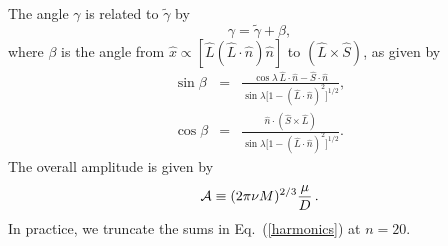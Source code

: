 \documentclass[12pt]{iopart}
\def\be{\begin{equation}}
\def\ee{\end{equation}}
\begin{document}
The angle $\gamma$ is related to $\tilde \gamma$ by
\be
\label{beta}
\gamma = \tilde\gamma + \beta,
\ee
where $\beta$ is the angle from $\hat x \propto [\hat L(\hat L \cdot \hat n) \hat n] $ to $(\hat L \times \hat S)$, as given by
\begin{eqnarray}\label{sinbeta}
\sin\beta &=& \frac{\cos\lambda\, \hat L\cdot\hat n -\hat S\cdot \hat n }
{\sin\lambda\bigl[1 - (\hat L\cdot\hat n)^2\bigr]^{1/2}}, \nonumber \\
\cos\beta &=& \frac{\hat n \cdot (\hat S \times \hat L)}
{\sin\lambda\bigl[1 - (\hat L\cdot\hat n)^2\bigr]^{1/2} }.
\end{eqnarray}
%
The overall amplitude is given by
\begin{equation} \label{calA}
{\cal A}\equiv (2\pi \nu M)^{2/3}\frac{\mu}{D}\,.
\end{equation}
In practice, we truncate the sums in Eq.~(\ref{harmonics}) at $n=20$.
\end{document}
